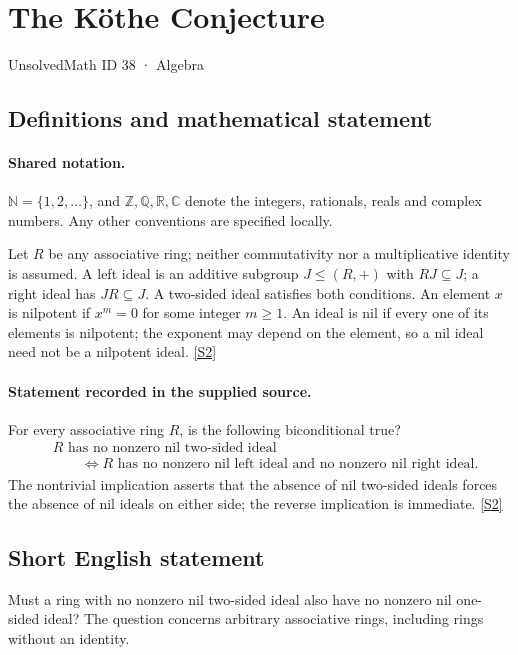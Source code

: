 \documentclass[11pt]{article}
\newcommand{\sref}[2]{\hyperlink{source:#1:#2}{[S#2]}}
\begin{document}
\setcounter{section}{37}
\section{The Köthe Conjecture}\label{38}
{\small\sffamily UnsolvedMath ID 38 · Algebra}
\subsection{Definitions and mathematical statement}

\paragraph{Shared notation.}$\mathbb N=\{1,2,\ldots\}$, and $\mathbb Z,\mathbb Q,\mathbb R,\mathbb C$ denote the integers, rationals, reals and complex numbers. Any other conventions are specified locally.


Let $R$ be any associative ring; neither commutativity nor a multiplicative identity is assumed. A left ideal is an additive subgroup $J\le(R,+)$ with $RJ\subseteq J$; a right ideal has $JR\subseteq J$. A two-sided ideal satisfies both conditions. An element $x$ is nilpotent if $x^m=0$ for some integer $m\ge1$. An ideal is nil if every one of its elements is nilpotent; the exponent may depend on the element, so a nil ideal need not be a nilpotent ideal. \sref{38}{2}
\paragraph{Statement recorded in the supplied source.}
For every associative ring $R$, is the following biconditional true?
\[
 \begin{aligned}
 &R\text{ has no nonzero nil two-sided ideal}\\
 &\qquad\Longleftrightarrow
 R\text{ has no nonzero nil left ideal and no nonzero nil right ideal}.
 \end{aligned}
\]
The nontrivial implication asserts that the absence of nil two-sided ideals forces the absence of nil ideals on either side; the reverse implication is immediate. \sref{38}{2}
\subsection{Short English statement}
Must a ring with no nonzero nil two-sided ideal also have no nonzero nil one-sided ideal? The question concerns arbitrary associative rings, including rings without an identity.
\end{document}
